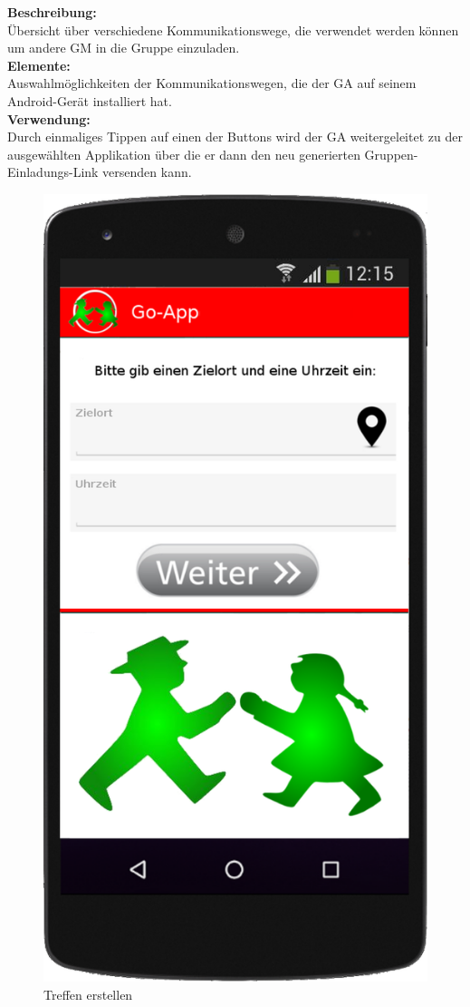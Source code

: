 \textbf{Beschreibung:}\\
Übersicht über verschiedene Kommunikationswege, die verwendet werden können um andere GM in die Gruppe einzuladen.\\
\textbf{Elemente:}\\
Auswahlmöglichkeiten der Kommunikationswegen, die der GA auf seinem Android-Gerät installiert hat.\\
\textbf{Verwendung:}\\
Durch einmaliges Tippen auf einen der Buttons wird der GA weitergeleitet zu der ausgewählten Applikation über die er dann den neu generierten Gruppen-Einladungs-Link versenden kann.
\clearpage
\newpage

\begin{figure}
	\includegraphics[scale=0.2]{resources/images/handy/treffpunkt_erstellen.png}
	\caption{Treffen erstellen}
\end{figure}

